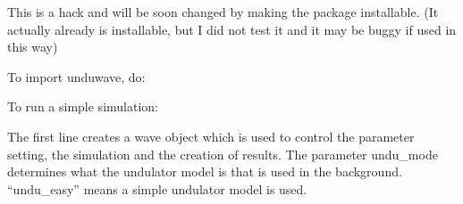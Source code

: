 \documentclass[letterpaper,10pt,english]{sphinxmanual}
\begin{document}
\begin{sphinxVerbatim}[commandchars=\\\{\}]
 
 
 
\end{sphinxVerbatim}

\begin{DUlineblock}{0em}
\item[] This is a hack and will be soon changed by making the package installable. (It actually already is installable, but I did not test it and it may be buggy if used in this way)
\end{DUlineblock}

\sphinxAtStartPar
To import unduwave, do:

\begin{sphinxVerbatim}[commandchars=\\\{\}]
   
\end{sphinxVerbatim}

\sphinxAtStartPar
To run a simple simulation:

\begin{sphinxVerbatim}[commandchars=\\\{\},numbers=left,firstnumber=1,stepnumber=1]
  
  
\end{sphinxVerbatim}

\begin{DUlineblock}{0em}
\item[] The first line creates a wave object which is used to control the parameter setting, the simulation and the creation of results. The parameter undu\_mode determines what the undulator model is that is used in the background. “undu\_easy” means a simple undulator model is used.
\end{DUlineblock}
\end{document}
